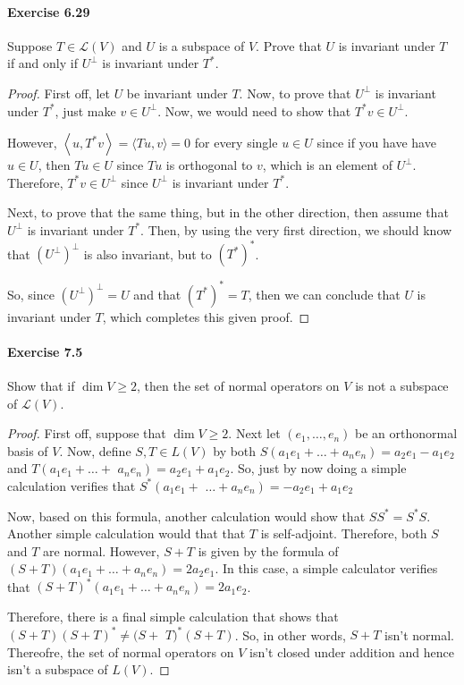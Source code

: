 \documentclass{article}
\theoremstyle{definition}
\begin{document}
\paragraph{Exercise 6.29} Suppose $T \in \mathcal{L}(V)$ and $U$ is a subspace of $V$. Prove that $U$ is invariant under $T$ if and only if $U^{\perp}$ is invariant under $T^{*}$.
\begin{proof}
    First off, let $U$ be invariant under $T$. Now, to prove that $U^{\perp}$ is invariant under $T^*$, just make $v \in U^{\perp}$. Now, we would need to show that $T^* v \in U^{\perp}$.

However, $\left\langle u, T^* v\right\rangle=\langle T u, v\rangle=0$ for every single $u \in U$ since if you have have $u \in U$, then $T u \in U$ since $T u$ is orthogonal to $v$, which is an element of $U^{\perp}$. Therefore, $T^* v \in U^{\perp}$ since $U^{\perp}$ is invariant under $T^*$.

Next, to prove that the same thing, but in the other direction, then assume that $U^{\perp}$ is invariant under $T^*$. Then, by using the very first direction, we should know that $\left(U^{\perp}\right)^{\perp}$ is also invariant, but to $\left(T^*\right)^*$.

So, since $\left(U^{\perp}\right)^{\perp}=U$ and that $\left(T^*\right)^*=T$, then we can conclude that $U$ is invariant under $T$, which completes this given proof.
\end{proof}



\paragraph{Exercise 7.5} Show that if $\operatorname{dim} V \geq 2$, then the set of normal operators on $V$ is not a subspace of $\mathcal{L}(V)$.
\begin{proof}
    First off, suppose that $\operatorname{dim} V \geq 2$. Next let $\left(e_1, \ldots, e_n\right)$ be an orthonormal basis of $V$. Now, define $S, T \in L(V)$ by both $S\left(a_1 e_1+\ldots+a_n e_n\right)=a_2 e_1-a_1 e_2$ and $T\left(a_1 e_1+\ldots+\right.$ $\left.a_n e_n\right)=a_2 e_1+a_1 e_2$. So, just by now doing a simple calculation verifies that $S^*\left(a_1 e_1+\right.$ $\left.\ldots+a_n e_n\right)=-a_2 e_1+a_1 e_2$

Now, based on this formula, another calculation would show that $S S^*=S^* S$. Another simple calculation would that that $T$ is self-adjoint. Therefore, both $S$ and $T$ are normal. However, $S+T$ is given by the formula of $(S+T)\left(a_1 e_1+\ldots+a_n e_n\right)=2 a_2 e_1$. In this case, a simple calculator verifies that $(S+T)^*\left(a_1 e_1+\ldots+a_n e_n\right)=2 a_1 e_2$.

Therefore, there is a final simple calculation that shows that $(S+T)(S+T)^* \neq(S+$ $T)^*(S+T)$. So, in other words, $S+T$ isn't normal. Thereofre, the set of normal operators on $V$ isn't closed under addition and hence isn't a subspace of $L(V)$.
\end{proof}
\end{document}
